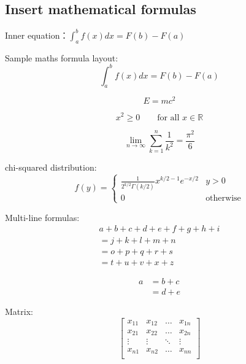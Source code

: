 \documentclass[12pt,hyperref,a4paper,UTF8]{article}
\begin{document}
\subsection{Insert mathematical formulas}
Inner equation：$\int_a^b f(x)dx = F(b)-F(a)$

Sample maths formula layout:
\begin{equation}\label{eq:1}
    \int_a^b f(x)dx = F(b)-F(a)
\end{equation}

\begin{equation}\label{eq:2}
    E = mc^2
\end{equation}

\begin{equation}\label{eq:3}
    x^2 \geq 0 \qquad \text{for all } x \in \mathbb{R}
\end{equation}

\begin{equation}\label{eq:4}
    \lim_{n \to \infty}
    \sum_{k=1}^n \frac{1}{k^2}
    = \frac{\pi^2}{6}
\end{equation}

chi-squared distribution:
\begin{equation}\label{eq:5}
    f(y) =
    \begin{cases}
        \frac{1}{2^{k/2}\Gamma(k/2)} x^{k/2-1} e^{-x/2} & y>0              \\
        0                                               & \text{otherwise}
    \end{cases}
\end{equation}

Multi-line formulas:
\begin{multline} \label{eq:6}
    a + b + c + d + e + f
    + g + h + i \\
    = j + k + l + m + n\\
    = o + p + q + r + s\\
    = t + u + v + x + z
\end{multline}

\begin{align} \label{eq:7}
    a & = b + c \\
      & = d + e
\end{align}

Matrix:
\begin{equation} \label{eq:8}
    \begin{bmatrix}
        x_{11} & x_{12} & \ldots & x_{1n} \\
        x_{21} & x_{22} & \ldots & x_{2n} \\
        \vdots & \vdots & \ddots & \vdots \\
        x_{n1} & x_{n2} & \ldots & x_{nn} \\
    \end{bmatrix}
\end{equation}
\end{document}
